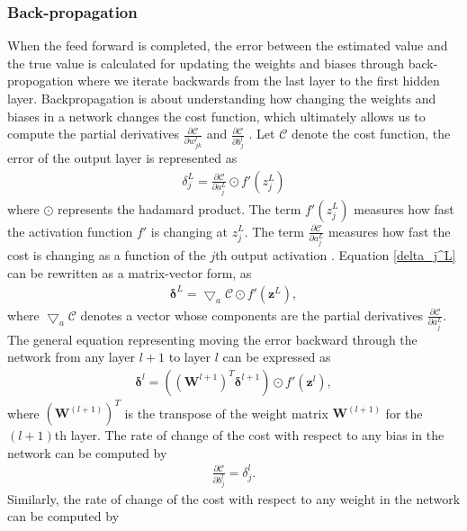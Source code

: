 \documentclass[a4paper]{article}
\begin{document}
\subsubsection{Back-propagation}
When the feed forward is completed, the error between the estimated value and the true value is calculated for updating the weights and biases through back-propogation \cite{lec} where we iterate backwards from the last layer to the first hidden layer. Backpropagation is about understanding how changing the weights and biases in a network changes the cost function, which ultimately allows us to compute the partial derivatives $\frac{\partial  \mathcal{C}}{\partial w^l_{jk}}$ and $\frac{\partial \mathcal{C}}{\partial b^l_j}$ \cite{nielsenneural}. Let $\mathcal{C}$ denote the cost function, the error of the output layer is represented as 
\begin{align}
    \delta_j^L= \frac{\partial \mathcal{C}}{\partial a_j^L} \odot f'(z_j^L)
    \label{delta_j^L}
\end{align}
where $\odot$ represents the hadamard product. The term $f'(z_j^L)$ measures how fast the activation function $f'$ is changing at $z_j^L$. The term $\frac{\partial \mathcal{C}}{\partial a_j^L}$ measures how fast the cost is changing as a function of the $j$th output activation \cite{nielsenneural}. Equation \ref{delta_j^L} can be rewritten as a matrix-vector form, as
\begin{align}
    \mathbf{\delta}^{L}= {\bigtriangledown}_{a} \mathcal{C} \odot f'(\mathbf{z}^L) ,
    \label{delta_j^L}
\end{align}
where ${\bigtriangledown}_{a} \mathcal{C}$ denotes a vector whose components are the partial derivatives $\frac{\partial \mathcal{C}}{\partial a_j^L}$. The general equation representing moving the error backward through the network from any layer $l+1$ to layer $l$ can be expressed as
\begin{align}
    \mathbf{\delta}^l = ((\mathbf{W}^{l+1})^T \mathbf{\delta}^{l+1}) \odot f'(\mathbf{z}^l),
\label{delta^l}
\end{align}
where $(\mathbf{W}^{(l+1)})^T$ is the transpose of the weight matrix $\mathbf{W}^{(l+1)}$ for the $(l+1)$th layer. The rate of change of the cost with respect to any bias in the network can be computed by 
\begin{align}
    \frac{\partial \mathcal{C}}{\partial b^l_j} = \delta^l_j.
    \label{delta_j^l}
\end{align}
Similarly, the rate of change of the cost with respect to any weight in the network can be computed by 
\end{document}

